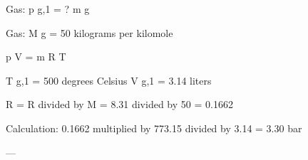 Gas:  
p g,1 = ?  
m g  

Gas:  
M g = 50 kilograms per kilomole  

p V = m R T  

T g,1 = 500 degrees Celsius  
V g,1 = 3.14 liters  

R = R divided by M = 8.31 divided by 50 = 0.1662  

Calculation:  
0.1662 multiplied by 773.15 divided by 3.14 = 3.30 bar  

---